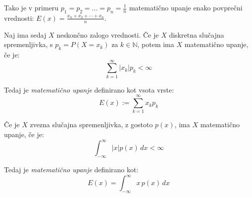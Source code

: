 \documentclass[12pt]{book}
\def\n{\noindent}
\theoremstyle{definition}
\theoremstyle{plain}
\theoremstyle{plain}
\theoremstyle{plain}
\theoremstyle{remark}
\begin{document}
Tako je v primeru $p_1=p_2=\ldots=p_n=\frac{1}{n}$ matematično upanje enako povprečni vrednosti: $E(x)=\frac{x_n+x_2+\cdots+x_n}{n}$. 

\n Naj ima sedaj $X$ neskončno zalogo vrednosti. Če je $X$ diskretna slučajna spremenljivka, s $p_k=P\left(X=x_k\right)$ za $k \in \mathbb{N}$, potem ima $X$ matematično upanje, če je: 
$$
\sum_{k=1}^{\infty}\left|x_k\right| p_k<\infty
$$

Tedaj je \emph{matematično upanje} definirano kot vsota vrste: 
$$
E(x):=\sum_{k=1}^{\infty} x_k p_k
$$

\n Če je $X$ zvezna slučajna spremenljivka, z gostoto $p(x)$, ima $X$ matematično upanje, če je:
$$
\int_{-\infty}^{\infty}|x|  p(x) \, d x<\infty
$$

Tedaj je \emph{matematično upanje} definirano kot: 
$$
E(x)=\int_{-\infty}^{\infty} x \, p(x) \, d x
$$
\end{document}

